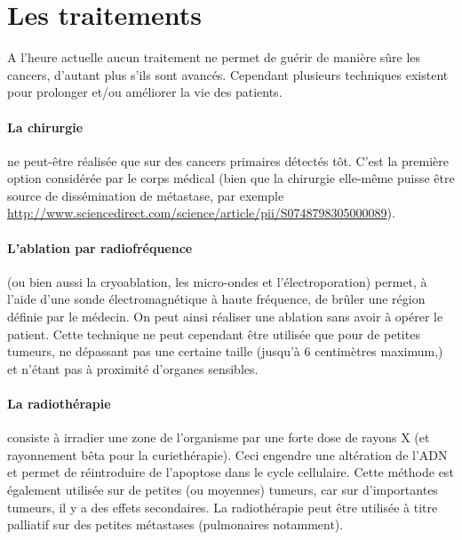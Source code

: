\documentclass[main.tex]{subfiles}
\begin{document}
\section{Les traitements}
A l'heure actuelle aucun traitement ne permet de guérir de manière sûre les cancers, d'autant plus s'ils sont avancés.  Cependant plusieurs techniques existent pour prolonger et/ou améliorer la vie des patients.
\paragraph{La chirurgie} ne peut-être réalisée que sur des cancers primaires %
détectés tôt. C'est la première option considérée par le corps médical (bien que la chirurgie elle-même puisse être source de dissémination de métastase, \cf par exemple  \url{http://www.sciencedirect.com/science/article/pii/S0748798305000089}).

\paragraph{L'ablation par radiofréquence} (ou bien aussi la cryoablation, les micro-ondes et l'électroporation) permet, à l'aide d'une sonde électromagnétique à haute fréquence, de brûler une région définie par le médecin. On peut ainsi réaliser une ablation sans avoir à opérer le patient. Cette technique  
ne peut cependant être utilisée que pour de petites tumeurs, ne dépassant pas une certaine taille (jusqu'à 6 centimètres maximum,) et n'étant pas à proximité d'organes sensibles. 

\paragraph{La radiothérapie} consiste à irradier une zone de l'organisme par une forte dose de rayons X (et rayonnement bêta pour la curiethérapie). 
Ceci engendre une altération de l'ADN et permet de réintroduire de l'apoptose dans le cycle cellulaire. 
Cette méthode est également utilisée sur de petites (ou moyennes) tumeurs, car sur d'importantes tumeurs, il y a des effets secondaires. 
La radiothérapie peut être %
utilisée à titre palliatif sur des petites métastases (pulmonaires notamment).
\end{document}
